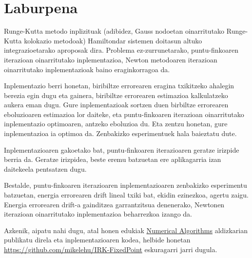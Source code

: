 \section{Laburpena}

Runge-Kutta metodo inplizituak (adibidez, Gauss nodoetan oinarritutako Runge-Kutta kolokazio metodoak) Hamiltondar sistemen doitasun altuko integrazioetarako aproposak dira. Problema ez-zurrunetarako, puntu-finkoaren iterazioan oinarritutako inplementazioa, Newton metodoaren iterazioan oinarritutako inplementazioak baino eraginkorragoa da.

Inplementazio berri honetan, biribiltze errorearen eragina txikitzeko ahalegin berezia egin dugu eta  gainera, biribiltze errorearen estimazioa kalkulatzeko aukera eman dugu. Gure inplementazioak sortzen duen birbiltze errorearen eboluzioaren estimazioa lor daiteke, eta puntu-finkoaren iterazioan oinarritutako inplementazio optimoaren, antzeko eboluzioa du. Eta zentzu honetan, gure inplementazioa ia optimoa da. Zenbakizko esperimentuek hala baieztatu dute.

Inplementazioaren gakoetako bat, puntu-finkoaren iterazioaren geratze irizpide berria da. Geratze irizpidea, beste eremu batzuetan ere aplikagarria izan daitekeela pentsatzen dugu.

Bestalde, puntu-finkoaren iterazioaren inplementazioaren zenbakizko esperimentu batzuetan,  energia errorearen drift lineal txiki bat, ekidin ezinezkoa, agertu zaigu. Energia errorearen drift-a gainditzea garrantzitsua denenerako, Newtonen iterazioan oinarritutako inplementazioa beharrezkoa izango da.

Azkenik, aipatu nahi dugu, atal honen edukiak \href{http://link.springer.com/journal/11075}{Numerical Algorithms} aldizkarian publikatu direla \cite{Antonana2017} eta inplementazioaren kodea, helbide honetan \url{https://github.com/mikelehu/IRK-FixedPoint} eskuragarri jarri dugula. 